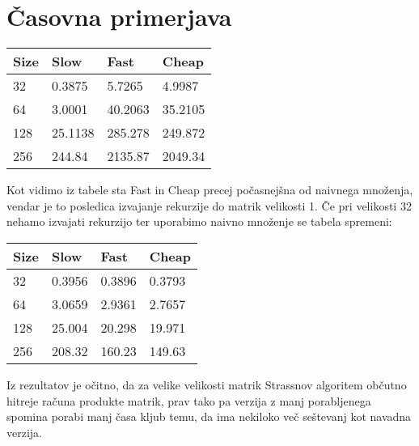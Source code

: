\documentclass[a4paper]{article}
\begin{document}
\section{Časovna primerjava}
\begin{table}[h]
    \begin{tabular}{|l|l|l|l|}
        \hline
        Size & Slow    & Fast    & Cheap   \\ \hline
        32   & 0.3875  & 5.7265  & 4.9987  \\ \hline
        64   & 3.0001  & 40.2063 & 35.2105 \\ \hline
        128  & 25.1138 & 285.278 & 249.872 \\ \hline
        256  & 244.84  & 2135.87 & 2049.34 \\
        \hline
    \end{tabular}
\end{table}

Kot vidimo iz tabele sta Fast in Cheap precej počasnejšna od naivnega množenja, vendar je to posledica izvajanje rekurzije do matrik velikosti 1. Če pri velikosti 32 nehamo izvajati rekurzijo ter uporabimo naivno množenje se tabela spremeni:

\begin{table}[h]
    \begin{tabular}{|l|l|l|l|}
        \hline
        Size & Slow   & Fast   & Cheap  \\ \hline
        32   & 0.3956 & 0.3896 & 0.3793 \\ \hline
        64   & 3.0659 & 2.9361 & 2.7657 \\ \hline
        128  & 25.004 & 20.298 & 19.971 \\ \hline
        256  & 208.32 & 160.23 & 149.63 \\
        \hline
    \end{tabular}
\end{table}

Iz rezultatov je očitno, da za velike velikosti matrik Strassnov algoritem občutno hitreje računa produkte matrik, prav tako pa verzija z manj porabljenega spomina porabi manj časa kljub temu, da ima nekiloko več seštevanj kot navadna verzija.
\end{document}
